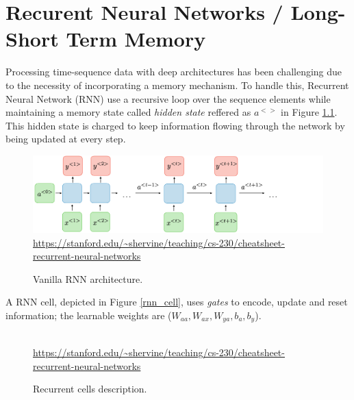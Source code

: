 \documentclass[12pt, a4paper]{report}
\begin{document}
	\chapter{Recurent Neural Networks / Long-Short Term Memory}\label{appendix_b}
		Processing time-sequence data with deep architectures has been challenging due to the necessity of incorporating a memory mechanism.
		To handle this, Recurrent Neural Network (RNN) use a recursive loop over the sequence elements while maintaining a memory state called {\itshape hidden state} reffered as {\itshape $a^{<>}$} in Figure \ref{rnn}.
		This hidden state is charged to keep information flowing through the network by being updated at every step.
		\begin{figure}[h!]
			\centering
			\includegraphics[width=1.\textwidth]{architecture-rnn-ltr.png}
			{\tiny \url{https://stanford.edu/~shervine/teaching/cs-230/cheatsheet-recurrent-neural-networks}}
			\caption{Vanilla RNN architecture.}
			\label{rnn}
		\end{figure}
		A RNN cell, depicted in Figure \ref{rnn_cell}, uses {\itshape gates} to encode, update and reset information; the learnable weights are ({\itshape $W_{aa},W_{ax},W_{ya},b_{a},b_{y}$}).
		\begin{figure}[h!]
			\centering
			\hfill
			 \\
			{\tiny \url{https://stanford.edu/~shervine/teaching/cs-230/cheatsheet-recurrent-neural-networks}}
			\caption{Recurrent cells description.}
		\end{figure}
\end{document}
